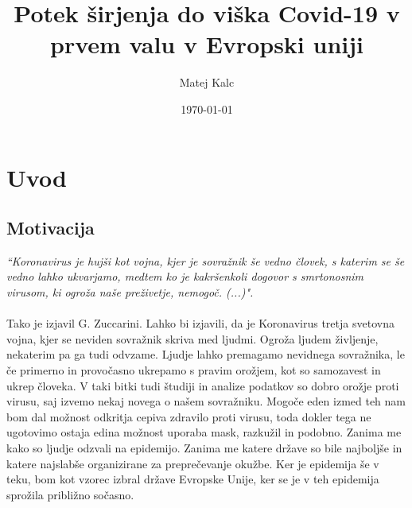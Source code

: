 \documentclass[a4paper,11pt]{article}
\title{Potek širjenja do viška Covid-19 v prvem valu v Evropski uniji}
\author{Matej Kalc} %
\date{\today}
\begin{document}
\maketitle

\section{Uvod}
\subsection{Motivacija}


\emph{“Koronavirus je hujši kot vojna, kjer je sovražnik še vedno človek, s katerim se še
vedno lahko ukvarjamo, medtem ko je kakršenkoli dogovor s smrtonosnim virusom,
ki ogroža naše preživetje, nemogoč. (...)".} \\ \\
Tako je izjavil G. Zuccarini. Lahko bi izjavili, da je Koronavirus tretja svetovna vojna, kjer se neviden sovražnik skriva med ljudmi. Ogroža ljudem življenje, nekaterim pa ga tudi odvzame. Ljudje lahko premagamo nevidnega sovražnika, le če primerno in provočasno ukrepamo s pravim orožjem, kot so samozavest in ukrep človeka. V taki bitki tudi študiji in analize podatkov so dobro orožje proti virusu, saj izvemo nekaj novega o našem sovražniku. Mogoče eden izmed teh nam bom dal možnost odkritja cepiva zdravilo proti virusu, toda dokler tega ne ugotovimo ostaja edina možnost uporaba mask, razkužil in podobno. Zanima me kako so ljudje odzvali na epidemijo. Zanima me katere države so bile najboljše in katere najslabše organizirane za preprečevanje okužbe. Ker je epidemija še v teku, bom kot vzorec izbral države Evropske Unije, ker se je v teh epidemija sprožila približno sočasno. 
\end{document}
